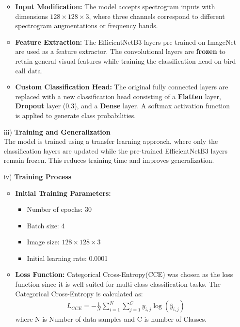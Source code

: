 \begin{itemize}
            \begin{itemize}
            \item \textbf{Input Modification:} The model accepts spectrogram inputs with dimensions \(128 \times 128 \times 3\), where three channels correspond to different spectrogram augmentations or frequency bands.
            \item \textbf{Feature Extraction:} The EfficientNetB3 layers pre-trained on ImageNet are used as a feature extractor. The convolutional layers are \textbf{frozen} to retain general visual features while training the classification head on bird call data.
            \item \textbf{Custom Classification Head:} The original fully connected layers are replaced with a new classification head consisting of a \textbf{Flatten} layer, \textbf{Dropout} layer (0.3), and a \textbf{Dense} layer. A softmax activation function is applied to generate class probabilities.
            \end{itemize}
            

      \item[iii)] \textbf{Training and Generalization} \\
            The model is trained using a transfer learning approach, where only the classification layers are updated while the pre-trained EfficientNetB3 layers remain frozen. This reduces training time and improves generalization.
            

      \item[iv)] \textbf{Training Process} 
            \begin{itemize}
                  \item \textbf{Initial Training Parameters:}
                  \begin{itemize}
                  \item Number of epochs: 30
                  \item Batch size: 4
                  \item Image size: \(128 \times 128 \times 3\)
                  \item Initial learning rate: 0.0001
                  \end{itemize}
            
                  \item \textbf{Loss Function:}
                  Categorical Cross-Entropy(CCE) was chosen as the loss function since it is well-suited for multi-class classification tasks. The Categorical Cross-Entropy is calculated as:
                  \begin{eqnarray}
                        L_{CCE} = -\frac{1}{N} \sum_{i=1}^{N} \sum_{j=1}^{C} y_{i,j} \log(\hat{y}_{i,j})
                  \end{eqnarray}
                        where N is Number of data samples and C is number of Classes.
                  

\end{itemize}
\end{itemize}
